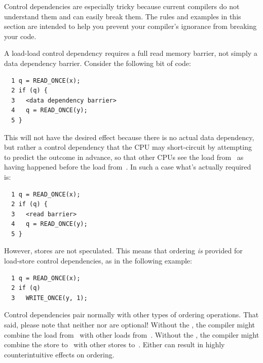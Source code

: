 Control dependencies are especially tricky because current compilers
do not understand them and can easily break them.
The rules and examples in this section are intended to help you
prevent your compiler's ignorance from breaking your code.

A load-load control dependency requires a full read memory barrier,
not simply a data dependency barrier.
Consider the following bit of code:

\vspace{5pt}
\begin{minipage}[t]{\columnwidth}
\scriptsize
\begin{verbatim}
  1 q = READ_ONCE(x);
  2 if (q) {
  3   <data dependency barrier>
  4   q = READ_ONCE(y);
  5 }
\end{verbatim}
\end{minipage}
\vspace{5pt}

This will not have the desired effect because there is no actual data
dependency, but rather a control dependency that the CPU may short-circuit
by attempting to predict the outcome in advance, so that other CPUs see
the load from~ as having happened before the load from~.
In such a case what's actually required is:

\vspace{5pt}
\begin{minipage}[t]{\columnwidth}
\scriptsize
\begin{verbatim}
  1 q = READ_ONCE(x);
  2 if (q) {
  3   <read barrier>
  4   q = READ_ONCE(y);
  5 }
\end{verbatim}
\end{minipage}
\vspace{5pt}

However, stores are not speculated.
This means that ordering \emph{is} provided for load-store control
dependencies, as in the following example:

\vspace{5pt}
\begin{minipage}[t]{\columnwidth}
\scriptsize
\begin{verbatim}
  1 q = READ_ONCE(x);
  2 if (q)
  3   WRITE_ONCE(y, 1);
\end{verbatim}
\end{minipage}
\vspace{5pt}

Control dependencies pair normally with other types of ordering operations.
That said, please note that neither  nor 
are optional!
Without the , the compiler might combine the load
from~ with other loads from~.
Without the , the compiler might combine the store
to~ with other stores to~.
Either can result in highly counterintuitive effects on ordering.

